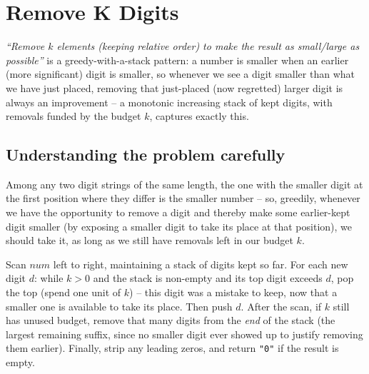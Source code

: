 \section{Remove K Digits}
\label{sec:sq-remove-k-digits}


\begin{patternbox}
\emph{``Remove $k$ elements (keeping relative order) to make the result as
small/large as possible''} is a greedy-with-a-stack pattern: a number is
smaller when an earlier (more significant) digit is smaller, so whenever
we see a digit smaller than what we have just placed, removing that
just-placed (now regretted) larger digit is always an improvement -- a
monotonic increasing stack of kept digits, with removals funded by the
budget $k$, captures exactly this.
\end{patternbox}

\subsection*{Understanding the problem carefully}

Among any two digit strings of the same length, the one with the smaller
digit at the first position where they differ is the smaller number --
so, greedily, whenever we have the opportunity to remove a digit and
thereby make some earlier-kept digit smaller (by exposing a smaller digit
to take its place at that position), we should take it, as long as we
still have removals left in our budget $k$.

\begin{ideabox}
Scan $\textit{num}$ left to right, maintaining a stack of digits kept so
far. For each new digit $d$: while $k>0$ and the stack is non-empty and
its top digit exceeds $d$, pop the top (spend one unit of $k$) -- this
digit was a mistake to keep, now that a smaller one is available to take
its place. Then push $d$. After the scan, if $k$ still has unused budget,
remove that many digits from the \emph{end} of the stack (the largest
remaining suffix, since no smaller digit ever showed up to justify
removing them earlier). Finally, strip any leading zeros, and return
\texttt{"0"} if the result is empty.
\end{ideabox}

